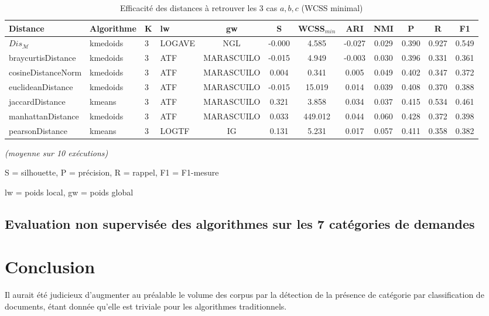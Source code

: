 \begin{table}[!htb]
	\scriptsize
	\begin{center}		
		\begin{tabular}{|l|l|l|l|c|c|c|c|c|c|c|c|}%
			\hline
			Distance & Algorithme& K& lw& gw& S & WCSS$_{min}$ & ARI& NMI& P& R& F1 \\ \hline
			$Dis_\mathcal{M}$ & kmedoids & 3 & LOGAVE & NGL & -0.000 & 4.585 & -0.027 & 0.029 & 0.390 & 0.927 & 0.549 \\ \hline
			braycurtisDistance & kmedoids & 3 & ATF & MARASCUILO & -0.015 & 4.949 & -0.003 & 0.030 & 0.396 & 0.331 & 0.361 \\ \hline
			cosineDistanceNorm & kmedoids & 3 & ATF & MARASCUILO & 0.004 & 0.341 & 0.005 & 0.049 & 0.402 & 0.347 & 0.372 \\ \hline
			euclideanDistance & kmedoids & 3 & ATF & MARASCUILO & -0.015 & 15.019 & 0.014 & 0.039 & 0.408 & 0.370 & 0.388 \\ \hline
			jaccardDistance & kmeans & 3 & ATF & MARASCUILO & 0.321 & 3.858 & 0.034 & 0.037 & 0.415 & 0.534 & 0.461 \\ \hline
			manhattanDistance & kmedoids & 3 & ATF & MARASCUILO & 0.033 & 449.012 & 0.044 & 0.060 & 0.428 & 0.372 & 0.398 \\ \hline
			pearsonDistance & kmeans & 3 & LOGTF & IG & 0.131 & 5.231 & 0.017 & 0.057 & 0.411 & 0.358 & 0.382 \\ \hline
		\end{tabular}
		
		\textit{(moyenne sur 10 exécutions)}
	\end{center}
	
	S = silhouette, P = précision, R = rappel, F1 = F1-mesure
	
	lw = poids local, gw = poids global
	
	
	\caption{Efficacité des distances à retrouver les 3 cas $a,b,c$ (WCSS minimal)}\label{tab:similarite:compare-dist-wcss}
\end{table}

\subsection{Evaluation non supervisée des algorithmes sur les 7 catégories de demandes}


\section{Conclusion}
\label{sec:similarite:conclusion}
Il aurait été judicieux d'augmenter au préalable le volume des corpus par la détection de la présence de catégorie par classification de documents, étant donnée qu'elle est triviale pour les algorithmes traditionnels.